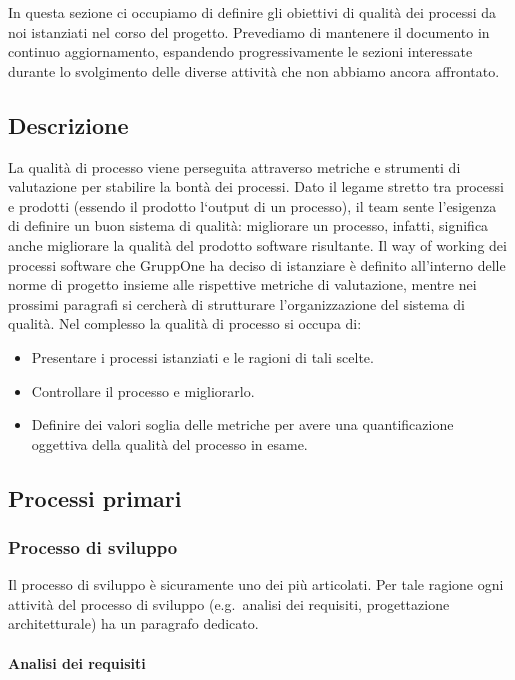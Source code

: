 \documentclass[../piano-di-qualifica.tex]{subfiles}
\begin{document}
In questa sezione ci occupiamo di definire gli obiettivi di qualità dei processi da noi istanziati nel corso del progetto.
Prevediamo di mantenere il documento in continuo aggiornamento, espandendo progressivamente le sezioni interessate durante lo svolgimento delle diverse attività che non abbiamo ancora affrontato.

\subsection{Descrizione}%
\label{sub:descrizione}

La qualità di processo viene perseguita attraverso metriche e strumenti di valutazione per stabilire la bontà dei processi.
Dato il legame stretto tra processi e prodotti (essendo il prodotto l`output di un processo), il team sente l'esigenza di definire un buon sistema di qualità: migliorare un processo, infatti, significa anche migliorare la qualità del prodotto software risultante.
Il way of working dei processi software che GruppOne ha deciso di istanziare è definito all'interno delle norme di progetto insieme alle rispettive metriche di valutazione, mentre nei prossimi paragrafi si cercherà di strutturare l'organizzazione del sistema di qualità.
Nel complesso la qualità di processo si occupa di:
\begin{itemize}
  \item Presentare i processi istanziati e le ragioni di tali scelte.
  \item Controllare il processo e migliorarlo.
  \item Definire dei valori soglia delle metriche per avere una quantificazione oggettiva della qualità del processo in esame.
\end{itemize}

\subsection{Processi primari}%
\label{sub:processi_primari}

\subsubsection{Processo di sviluppo}%
\label{subs:processo_di_sviluppo}
Il processo di sviluppo è sicuramente uno dei più articolati. Per tale ragione ogni attività del processo di sviluppo (e.g.\ analisi dei requisiti, progettazione architetturale) ha un paragrafo dedicato.

\paragraph{Analisi dei requisiti}%
\label{par:analisi_dei_requisiti}
\end{document}
